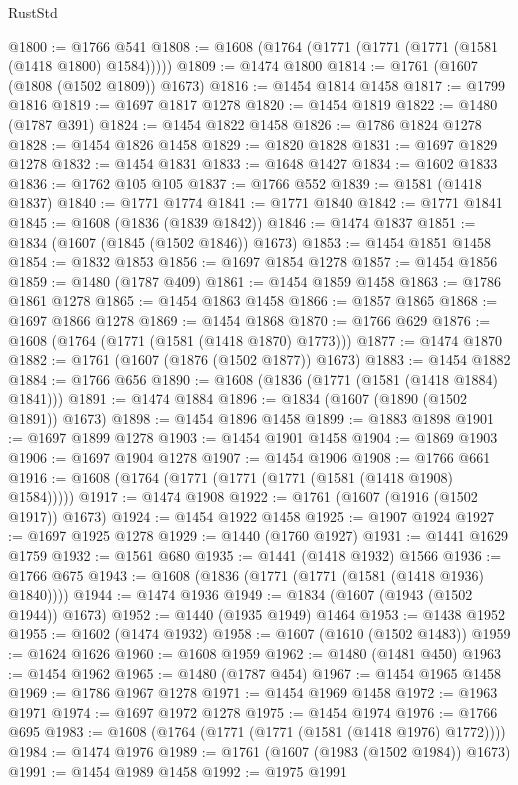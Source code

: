 \begin{lexlean}{RustStd}
\begin{coremodule}
{\begin{coremodule}
{{{{{{{{{{{{{{{{{{{{{{{{{{{{{{{@1800 := @1766 @541
@1808 := @1608 (@1764 (@1771 (@1771 (@1771 (@1581 (@1418 @1800) @1584)))))
@1809 := @1474 @1800
@1814 := @1761 (@1607 (@1808 (@1502 @1809)) @1673)
@1816 := @1454 @1814 @1458
@1817 := @1799 @1816
@1819 := @1697 @1817 @1278
@1820 := @1454 @1819
@1822 := @1480 (@1787 @391)
@1824 := @1454 @1822 @1458
@1826 := @1786 @1824 @1278
@1828 := @1454 @1826 @1458
@1829 := @1820 @1828
@1831 := @1697 @1829 @1278
@1832 := @1454 @1831
@1833 := @1648 @1427
@1834 := @1602 @1833
@1836 := @1762 @105 @105
@1837 := @1766 @552
@1839 := @1581 (@1418 @1837)
@1840 := @1771 @1774
@1841 := @1771 @1840
@1842 := @1771 @1841
@1845 := @1608 (@1836 (@1839 @1842))
@1846 := @1474 @1837
@1851 := @1834 (@1607 (@1845 (@1502 @1846)) @1673)
@1853 := @1454 @1851 @1458
@1854 := @1832 @1853
@1856 := @1697 @1854 @1278
@1857 := @1454 @1856
@1859 := @1480 (@1787 @409)
@1861 := @1454 @1859 @1458
@1863 := @1786 @1861 @1278
@1865 := @1454 @1863 @1458
@1866 := @1857 @1865
@1868 := @1697 @1866 @1278
@1869 := @1454 @1868
@1870 := @1766 @629
@1876 := @1608 (@1764 (@1771 (@1581 (@1418 @1870) @1773)))
@1877 := @1474 @1870
@1882 := @1761 (@1607 (@1876 (@1502 @1877)) @1673)
@1883 := @1454 @1882
@1884 := @1766 @656
@1890 := @1608 (@1836 (@1771 (@1581 (@1418 @1884) @1841)))
@1891 := @1474 @1884
@1896 := @1834 (@1607 (@1890 (@1502 @1891)) @1673)
@1898 := @1454 @1896 @1458
@1899 := @1883 @1898
@1901 := @1697 @1899 @1278
@1903 := @1454 @1901 @1458
@1904 := @1869 @1903
@1906 := @1697 @1904 @1278
@1907 := @1454 @1906
@1908 := @1766 @661
@1916 := @1608 (@1764 (@1771 (@1771 (@1771 (@1581 (@1418 @1908) @1584)))))
@1917 := @1474 @1908
@1922 := @1761 (@1607 (@1916 (@1502 @1917)) @1673)
@1924 := @1454 @1922 @1458
@1925 := @1907 @1924
@1927 := @1697 @1925 @1278
@1929 := @1440 (@1760 @1927)
@1931 := @1441 @1629 @1759
@1932 := @1561 @680
@1935 := @1441 (@1418 @1932) @1566
@1936 := @1766 @675
@1943 := @1608 (@1836 (@1771 (@1771 (@1581 (@1418 @1936) @1840))))
@1944 := @1474 @1936
@1949 := @1834 (@1607 (@1943 (@1502 @1944)) @1673)
@1952 := @1440 (@1935 @1949) @1464
@1953 := @1438 @1952
@1955 := @1602 (@1474 @1932)
@1958 := @1607 (@1610 (@1502 @1483))
@1959 := @1624 @1626
@1960 := @1608 @1959
@1962 := @1480 (@1481 @450)
@1963 := @1454 @1962
@1965 := @1480 (@1787 @454)
@1967 := @1454 @1965 @1458
@1969 := @1786 @1967 @1278
@1971 := @1454 @1969 @1458
@1972 := @1963 @1971
@1974 := @1697 @1972 @1278
@1975 := @1454 @1974
@1976 := @1766 @695
@1983 := @1608 (@1764 (@1771 (@1771 (@1581 (@1418 @1976) @1772))))
@1984 := @1474 @1976
@1989 := @1761 (@1607 (@1983 (@1502 @1984)) @1673)
@1991 := @1454 @1989 @1458
@1992 := @1975 @1991
}}}}}}}}}}}}}}}}}}}}}}}}}}}}}}}
\end{coremodule}}
\end{coremodule}
\end{lexlean}
